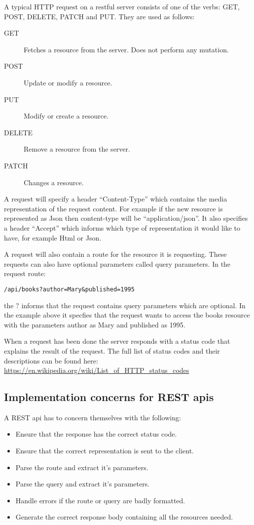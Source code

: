 A typical HTTP request on a restful server consists of one of the  verbs: GET,
POST, DELETE, PATCH and PUT. They are used as follows:

\begin{description}
\item[GET] Fetches a resource from the server. Does not perform any mutation. 
\item[POST] Update or modify a resource.
\item[PUT] Modify or create a resource.
\item[DELETE] Remove a resource from the server.
\item[PATCH] Changes a resource.
\end{description}

A request will specify a header ``Content-Type'' which contains the media
representation of the request content. For example if the new resource is
represented as Json then content-type will be ``application/json''. It also
specifies a header ``Accept'' which informs which type of representation it
would like to have, for example Html or Json. 

A request will also contain a route for the resource it is requesting. These
requests can also have optional parameters called query parameters. In the
request route:

\begin{lstlisting}
/api/books?author=Mary&published=1995
\end{lstlisting}

the $?$ informs that the request contains query parameters which are optional.
In the example above it specfies that the request wants to access the books
resource with the parameters author as Mary and published as 1995.


When a request has been done the server responds with a status code that
explains the result of the request. The full list of status codes and their
descriptions can be found here:
\url{https://en.wikipedia.org/wiki/List_of_HTTP_status_codes}

\subsection{Implementation concerns for REST apis}

A REST api has to concern themselves with the following:

\begin{itemize}
\item Ensure that the response has the correct status code.
\item Ensure that the correct representation is sent to the client.
\item Parse the route and extract it's parameters. 
\item Parse the query and extract it's parameters.
\item Handle errors if the route or query are badly formatted.
\item Generate the correct response body containing all the resources needed.
\end{itemize}

